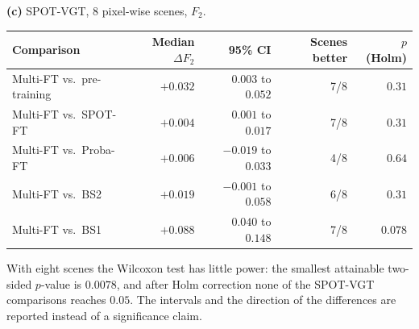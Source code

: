 \begin{table}[h]
\vspace{8pt}
\textbf{(c)} SPOT-VGT, 8 pixel-wise scenes, $F_2$.
\\[2pt]
\begin{tabular}{lrrrr}
\toprule
Comparison & Median $\Delta F_2$ & 95\% CI & Scenes better & $p$ (Holm) \\
\midrule
Multi-FT vs.\ pre-training & $+0.032$ & $0.003$ to $0.052$ & 7/8 & $0.31$ \\
Multi-FT vs.\ SPOT-FT      & $+0.004$ & $0.001$ to $0.017$ & 7/8 & $0.31$ \\
Multi-FT vs.\ Proba-FT     & $+0.006$ & $-0.019$ to $0.033$ & 4/8 & $0.64$ \\
Multi-FT vs.\ BS2          & $+0.019$ & $-0.001$ to $0.058$ & 6/8 & $0.31$ \\
Multi-FT vs.\ BS1          & $+0.088$ & $0.040$ to $0.148$ & 7/8 & $0.078$ \\
\bottomrule
\end{tabular}

\vspace{6pt}
\parbox{0.95\textwidth}{\footnotesize With eight scenes the Wilcoxon test has little power: the smallest attainable two-sided $p$-value is $0.0078$, and after Holm correction none of the SPOT-VGT comparisons reaches $0.05$. The intervals and the direction of the differences are reported instead of a significance claim.}
\end{table}

